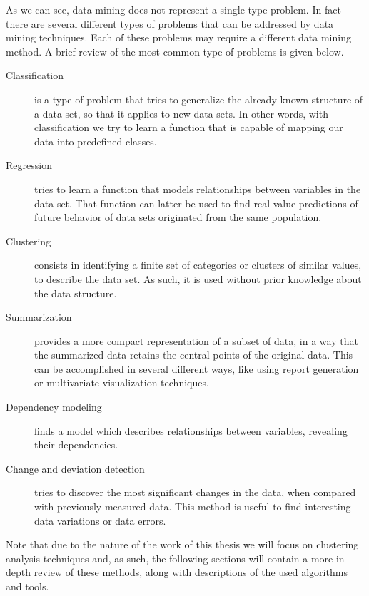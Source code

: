 As we can see, data mining does not represent a single type problem. In fact
there are several different types of problems that can be addressed by data
mining techniques. Each of these problems may require a different data mining
method. A brief review of the most common type of problems is given below.

\begin{description}

  \item[Classification]
  is a type of problem that tries to generalize the already known structure of a
  data set, so that it applies to new data sets. In other words, with
  classification we try to learn a function that is capable of mapping our data
  into predefined classes.

  \item[Regression]
  tries to learn a function that models relationships between variables in the
  data set. That function can latter be used to find real value predictions of
  future behavior of data sets originated from the same population.

  \item[Clustering]
  consists in identifying a finite set of categories or clusters of similar
  values, to describe the data set. As such, it is used without prior knowledge
  about the data structure.

  \item[Summarization]
  provides a more compact representation of a subset of data, in a way that the
  summarized data retains the central points of the original data. This can be
  accomplished in several different ways, like using report generation or
  multivariate visualization techniques.

  \item[Dependency modeling]
  finds a model which describes relationships between variables, revealing their
  dependencies.

  \item[Change and deviation detection]
  tries to discover the most significant changes in the data, when compared with
  previously measured data. This method is useful to find interesting data
  variations or data errors.

\end{description}

Note that due to the nature of the work of this thesis we will focus on
clustering analysis techniques and, as such, the following sections will contain
a more in-depth review of these methods, along with descriptions of the used
algorithms and tools.

